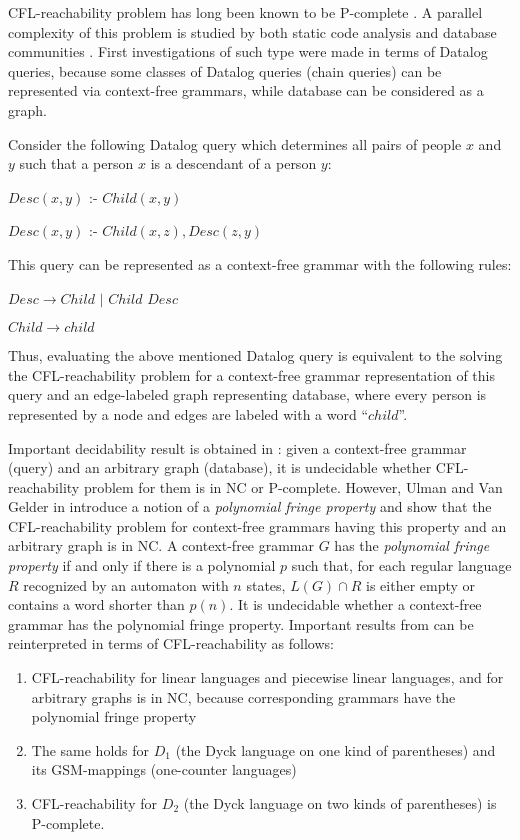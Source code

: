 \documentclass{ws-ijfcs}
\begin{document}
CFL-reachability problem has long been known to be P-complete \cite{PCompl}. A parallel complexity of this problem is studied by both static code analysis \cite{RepSeq, RepsBasic} and database communities \cite{ChainQ, Ullman, Yannakakis}. First investigations of such type were made in terms of Datalog queries, because some classes of Datalog queries (chain queries) can be represented via context-free grammars, while database can be considered as a graph. 
\begin{example}
Consider the following Datalog query which determines all pairs of people $x$ and $y$ such that a person $x$ is a descendant of a person $y$: 


$Desc(x, y)$ :- $Child(x, y)$

$Desc(x, y)$ :- $Child(x, z), Desc(z, y)$


This query can be represented as a context-free grammar with the following rules: 


$Desc \rightarrow Child$ $\vert$ $Child$ $Desc$


$Child  \rightarrow child$


Thus, evaluating the above mentioned Datalog query is equivalent to the solving the CFL-reachability problem for a context-free grammar representation of this query and an edge-labeled graph representing database, where every person is represented by a node and edges are labeled with a word ``$child$''. 
\end{example}
Important decidability result is obtained in \cite{Vardi}: given a context-free grammar (query) and an arbitrary graph (database), it is undecidable whether CFL-reachability problem for them is in NC or P-complete. However, Ulman and Van Gelder in \cite{Ullman} introduce a notion of a  \textit{polynomial fringe property} and show that the CFL-reachability problem for context-free grammars having this property and an arbitrary graph is in NC. A context-free grammar $G$ has the \textit{polynomial fringe property} if and only if there is a polynomial $p$ such that, for each regular language $R$ recognized by an automaton with $n$ states, $L(G) \cap R$ is either empty or contains a word shorter than $p(n)$. It is undecidable whether a context-free grammar has the polynomial fringe property. Important results from \cite{Ullman} can be reinterpreted in terms of CFL-reachability as follows: 
\begin{enumerate}
\item CFL-reachability for linear languages and piecewise linear languages, and for arbitrary graphs is in NC, because corresponding grammars have the polynomial fringe property
\item The same holds for $D_1$ (the Dyck language on one kind of parentheses) and its GSM-mappings (one-counter languages)
\item CFL-reachability for $D_2$ (the Dyck language on two kinds of parentheses) is P-complete.
\end{enumerate}
\end{document}
